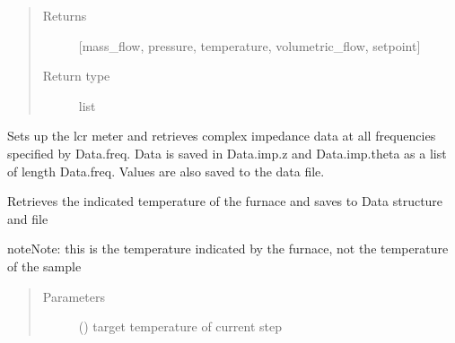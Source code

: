 \documentclass[letterpaper,10pt,english]{sphinxmanual}
\begin{document}
\begin{fulllineitems}
\begin{fulllineitems}
\begin{quote}
\begin{description}
\item[{Returns}] \leavevmode
{[}mass\_flow, pressure, temperature, volumetric\_flow, setpoint{]}

\item[{Return type}] \leavevmode
list

\end{description}\end{quote}

\end{fulllineitems}


\begin{fulllineitems}
\label{\detokenize{laboratory:laboratory.Setup.get_impedance}}
Sets up the lcr meter and retrieves complex impedance data at all frequencies specified by Data.freq. Data is saved in Data.imp.z and Data.imp.theta as a list of length Data.freq. Values are also saved to the data file.

\end{fulllineitems}


\begin{fulllineitems}
\label{\detokenize{laboratory:laboratory.Setup.get_temp}}
Retrieves the indicated temperature of the furnace and saves to Data structure and file

\begin{sphinxadmonition}{note}{Note:}
this is the temperature indicated by the furnace, not the temperature of the sample
\end{sphinxadmonition}
\begin{quote}\begin{description}
\item[{Parameters}] \leavevmode
{} () \textendash{} target temperature of current step

\end{description}\end{quote}

\end{fulllineitems}


\end{fulllineitems}
\end{document}
